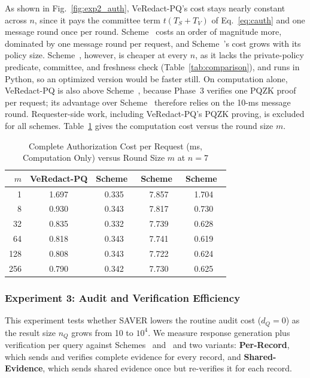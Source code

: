 \documentclass[lettersize,journal]{IEEEtran}
\begin{document}
As shown in Fig.~\ref{fig:exp2_auth}, VeRedact-PQ's cost stays nearly
constant across $n$, since it pays the
committee term $t(T_S+T_V)$ of Eq.~\eqref{eq:cauth} and one message
round once per round. Scheme~\cite{ref1} costs an order of magnitude
more, dominated by one message round per request, and
Scheme~\cite{ref34}'s cost grows with its policy size.
Scheme~\cite{ref39}, however, is cheaper at every $n$, as it lacks the
private-policy predicate, committee, and freshness check
(Table~\ref{tab:comparison}), and runs in Python, so an optimized
version would be faster still. On computation alone, VeRedact-PQ is
also above Scheme~\cite{ref1}, because Phase~3 verifies one PQZK proof
per request; its advantage over Scheme~\cite{ref1} therefore relies on
the 10-ms message round. Requester-side work, including VeRedact-PQ's
PQZK proving, is excluded for all schemes. Table~\ref{tab:exp2_m} gives
the computation cost versus the round size $m$.

\begin{table}[t]
\centering
\caption{Complete Authorization Cost per Request (ms, Computation
Only) versus Round Size $m$ at $n=7$}
\label{tab:exp2_m}
\scriptsize
\renewcommand{\arraystretch}{1.08}
\setlength{\tabcolsep}{4pt}
\begin{tabular}{rcccc}
\hline
$m$ & VeRedact-PQ & Scheme~\cite{ref1} & Scheme~\cite{ref34} & Scheme~\cite{ref39} \\
\hline
1    & 1.697 & 0.335 & 7.857 & 1.704 \\
8    & 0.930 & 0.343 & 7.817 & 0.730 \\
32   & 0.835 & 0.332 & 7.739 & 0.628 \\
64   & 0.818 & 0.343 & 7.741 & 0.619 \\
128  & 0.808 & 0.343 & 7.722 & 0.624 \\
256  & 0.790 & 0.342 & 7.730 & 0.625 \\
\hline
\end{tabular}
\end{table}

\subsubsection*{\textbf{Experiment 3: Audit and Verification Efficiency}}

This experiment tests whether SAVER lowers the routine audit cost
($d_Q=0$) as the result size $n_Q$ grows from 10 to $10^4$. We measure
response generation plus verification per query against
Schemes~\cite{ref1} and~\cite{ref13} and two variants:
\textbf{Per-Record}, which sends and verifies complete evidence for
every record, and \textbf{Shared-Evidence}, which sends shared evidence
once but re-verifies it for each record.
\end{document}
